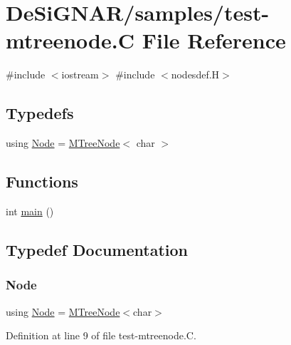 \hypertarget{test-mtreenode_8_c}{}\section{De\+Si\+G\+N\+A\+R/samples/test-\/mtreenode.C File Reference}
\label{test-mtreenode_8_c}
{\ttfamily \#include $<$iostream$>$}\newline
{\ttfamily \#include $<$nodesdef.\+H$>$}\newline
\subsection*{Typedefs}
\begin{DoxyCompactItemize}
\item 
using \hyperlink{test-mtreenode_8_c_a17a24b0725f59987143c5faf63c4dc6f}{Node} = \hyperlink{class_designar_1_1_m_tree_node}{M\+Tree\+Node}$<$ char $>$
\end{DoxyCompactItemize}
\subsection*{Functions}
\begin{DoxyCompactItemize}
\item 
int \hyperlink{test-mtreenode_8_c_ae66f6b31b5ad750f1fe042a706a4e3d4}{main} ()
\end{DoxyCompactItemize}


\subsection{Typedef Documentation}
\mbox{\label{test-mtreenode_8_c_a17a24b0725f59987143c5faf63c4dc6f}} 
\subsubsection{\texorpdfstring{Node}{Node}}
{\footnotesize\ttfamily using \hyperlink{namespace_designar_a5af326c65aa2bd26b26c410f2030d09e}{Node} =  \hyperlink{class_designar_1_1_m_tree_node}{M\+Tree\+Node}$<$char$>$}



Definition at line 9 of file test-\/mtreenode.\+C.



